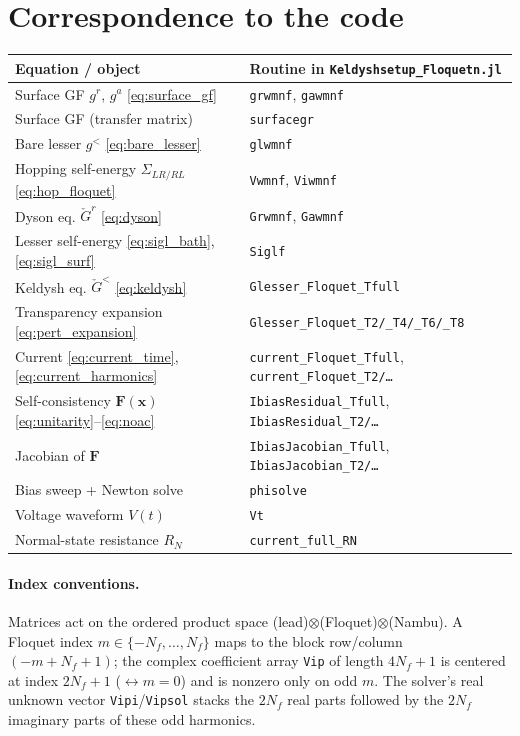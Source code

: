 \documentclass[11pt,a4paper]{article}
\newcommand{\Gr}{\check{G}}            %
\begin{document}
\section{Correspondence to the code}
\label{sec:codemap}

\begin{center}
\renewcommand{\arraystretch}{1.25}
\begin{tabular}{ll}
\hline
\textbf{Equation / object} & \textbf{Routine in \texttt{Keldyshsetup\_Floquetn.jl}}\\
\hline
Surface GF $g^r$, $g^a$ \eqref{eq:surface_gf} & \texttt{grwmnf}, \texttt{gawmnf}\\
Surface GF (transfer matrix) & \texttt{surfacegr}\\
Bare lesser $g^<$ \eqref{eq:bare_lesser} & \texttt{glwmnf}\\
Hopping self-energy $\Sigma_{LR/RL}$ \eqref{eq:hop_floquet} & \texttt{Vwmnf}, \texttt{Viwmnf}\\
Dyson eq. $\Gr^r$ \eqref{eq:dyson} & \texttt{Grwmnf}, \texttt{Gawmnf}\\
Lesser self-energy \eqref{eq:sigl_bath}, \eqref{eq:sigl_surf} & \texttt{Siglf}\\
Keldysh eq. $\Gr^<$ \eqref{eq:keldysh} & \texttt{Glesser\_Floquet\_Tfull}\\
Transparency expansion \eqref{eq:pert_expansion} & \texttt{Glesser\_Floquet\_T2/\_T4/\_T6/\_T8}\\
Current \eqref{eq:current_time}, \eqref{eq:current_harmonics} & \texttt{current\_Floquet\_Tfull}, \texttt{current\_Floquet\_T2/\ldots}\\
Self-consistency $\mathbf F(\mathbf x)$ \eqref{eq:unitarity}--\eqref{eq:noac} & \texttt{IbiasResidual\_Tfull}, \texttt{IbiasResidual\_T2/\ldots}\\
Jacobian of $\mathbf F$ & \texttt{IbiasJacobian\_Tfull}, \texttt{IbiasJacobian\_T2/\ldots}\\
Bias sweep + Newton solve & \texttt{phisolve}\\
Voltage waveform $V(t)$ & \texttt{Vt}\\
Normal-state resistance $R_N$ & \texttt{current\_full\_RN}\\
\hline
\end{tabular}
\end{center}

\paragraph{Index conventions.}
Matrices act on the ordered product space (lead)$\otimes$(Floquet)$\otimes$(Nambu).
A Floquet index $m\in\{-N_f,\dots,N_f\}$ maps to the block row/column
$(-m+N_f+1)$; the complex coefficient array \texttt{Vip} of length $4N_f+1$ is
centered at index $2N_f+1$ ($\leftrightarrow m=0$) and is nonzero only on odd
$m$.  The solver's real unknown vector \texttt{Vipi}/\texttt{Vipsol} stacks the
$2N_f$ real parts followed by the $2N_f$ imaginary parts of these odd
harmonics.
\end{document}
